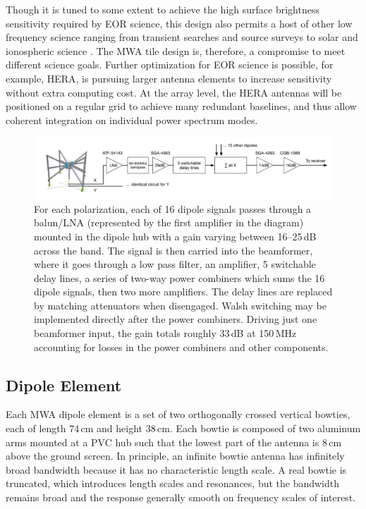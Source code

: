 \begin{subappendices}
Though it is tuned to some extent to achieve the high surface brightness sensitivity required by EOR science, this design also permits a host of other low frequency science ranging from transient searches and source surveys to solar and ionospheric science \citep{mwascience}. The MWA tile design is, therefore, a compromise to meet different science goals. Further optimization for EOR science is possible, for example, HERA, is pursuing larger antenna elements to increase sensitivity without extra computing cost. At the array level, the HERA antennas will be positioned on a regular grid to achieve many redundant baselines, and thus allow coherent integration on individual power spectrum modes.

\begin{figure}[h]
\includegraphics[width=6in]{chap2_beamforming_errors/beamformer_signal_path.pdf}
\caption[Beamformer signal path.]{For each polarization, each of 16 dipole signals passes through a balun/LNA (represented by the first amplifier in the diagram) mounted in the dipole hub with a gain varying between 16--25\,dB across the band. The signal is then carried into the beamformer, where it goes through a low pass filter, an amplifier, 5 switchable delay lines, a series of two-way power combiners which sums the 16 dipole signals, then two more amplifiers. The delay lines are replaced by matching attenuators when disengaged. Walsh switching may be implemented directly after the power combiners. Driving just one beamformer input, the gain totals roughly 33\,dB at 150\,MHz accounting for losses in the power combiners and other components. }
\label{fig:beamformersdiagram}
\end{figure}

\subsection{Dipole Element}

Each MWA dipole element is a set of two orthogonally crossed vertical bowties, each of length 74\,cm and height 38\,cm. Each bowtie is composed of two aluminum arms mounted at a PVC hub such that the lowest part of the antenna is 8\,cm above the ground screen. In principle, an infinite bowtie antenna has infinitely broad bandwidth because it has no characteristic length scale. A real bowtie is truncated, which introduces length scales and resonances, but the bandwidth remains broad and the response generally smooth on frequency scales of interest. 


\end{subappendices}
